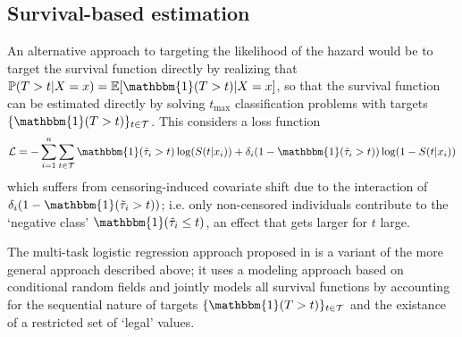 \documentclass{article}
\newcommand{\Tc}{{\mathcal T}}
\newcommand{\one}{{\mathbbm{1}}}
\newcommand{\PR}{{\mathbb P}}
\newcommand{\tmax}{{t_{\text{max}}}}
\begin{document}
\subsection{Survival-based estimation} 
An alternative approach to targeting the likelihood of the hazard would be to target the survival function directly by realizing that $\PR(T>t|X=x)=\mathbb{E}[\one(T>t)|X=x]$, so that the survival function can be estimated directly by solving $\tmax$ classification problems with targets $\{\one(T>t)\}_{t \in \Tc}$. This considers a loss function
\begin{equation}
    \mathcal{L} =  - \sum^n_{i=1} \sum_{t \in \Tc}  \one(\tilde{\tau}_i > t)  \log(S(t|x_i)) + \delta_i(1 - \one(\tilde{\tau}_i > t)) \log(1-S(t|x_i))
\end{equation}
which suffers from censoring-induced covariate shift due to the interaction of $\delta_i(1 - \one(\tilde{\tau}_i > t))$; i.e. only non-censored individuals contribute to the `negative class' $\one(\tilde{\tau}_i \leq t)$, an effect that gets larger for $t$ large. 

The multi-task logistic regression approach proposed in \cite{yu2011learning} is a variant of the more general approach described above; it uses a modeling approach based on conditional random fields \cite{lafferty2001conditional} and jointly models all survival functions by accounting for the sequential nature of targets $\{\one(T>t)\}_{t \in \Tc}$ and the existance of a restricted set of `legal' values.
\end{document}
